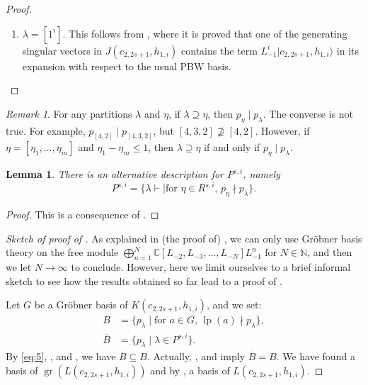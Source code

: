 \documentclass[a4paper, 12pt, reqno]{amsart}
\newtheorem{lemma}[theorem]{Lemma}
\theoremstyle{remark}
\newtheorem{remark}[theorem]{Remark}
\DeclareMathOperator{\gr}{gr}
\DeclareMathOperator{\lp}{lp}
\newcommand{\vac}{{|0\rangle}}
\begin{document}
\begin{proof}
\begin{enumerate}
    From \eqref{eq:6} and , we see that $\lp(u) = \lp((L_{-2}^s\vac)_{(s - sa + d - 1)}|c_{2, 2s + 1}, h_{1, i}\rangle) = L_\lambda|c_{2, 2s + 1}, h_{1, i}\rangle$.
    Finally, by , $u \in J(c_{2, 2s + 1}, h_{1, i})$, and it is clear that $u$ is homogeneous from its definition.
  \item $\lambda = [1^i]$.
    This follows from \cite{benoit_degenerate_1988}, where it is proved that one of the generating singular vectors in $J(c_{2, 2s + 1}, h_{1, i})$ contains the term $L_{-1}^i|c_{2, 2s + 1}, h_{1, i}\rangle$ in its expansion with respect to the usual PBW basis. \qedhere
  \end{enumerate}
\end{proof}

\begin{remark}
  \label{rmk:2}
  For any partitions $\lambda$ and $\eta$, if $\lambda \supseteq \eta$, then $p_\eta \mid p_\lambda$.
  The converse is not true.
  For example, $p_{[4, 2]} \mid p_{[4, 3, 2]}$, but $[4, 3, 2] \nsupseteq [4, 2]$.
  However, if $\eta = [\eta_1, \dots, \eta_m]$ and $\eta_1 - \eta_m \le 1$, then $\lambda \supseteq \eta$ if and only if $p_\eta \mid p_\lambda$.
\end{remark}

\begin{lemma}
  \label{lmm:6}
  There is an alternative description for $P^{s, i}$, namely
  \begin{equation*}
    P^{s, i} = \{\lambda \vdash \mid \text{for $\eta \in R^{s, i}$, $p_\eta \nmid p_\lambda$}\}.
  \end{equation*}
\end{lemma}

\begin{proof}
  This is a consequence of .
\end{proof}

\begin{proof}[Sketch of proof of ]
  As explained in (the proof of) \cite[Theorem 0.4]{salazar_pbw_2024}, we can only use Gröbner basis theory on the free module $\bigoplus_{n = 1}^N\mathbb{C}[L_{-2}, L_{-3}, \dots, L_{-N}]L_{-1}^n$ for $N \in \mathbb{N}$, and then we let $N \to \infty$ to conclude.
  However, here we limit ourselves to a brief informal sketch to see how the results obtained so far lead to a proof of .

  Let $G$ be a Gröbner basis of $K(c_{2, 2s + 1}, h_{1, i})$, and we set:
  \begin{align*}
    B &= \{p_\lambda \mid \text{for $a \in G$, $\lp(a) \nmid p_\lambda$}\}, \\
    \overline{B} &= \{p_\lambda \mid \lambda \in P^{s, i}\}.
  \end{align*}
  By \eqref{eq:5}, , and , we have $\overline{B} \subseteq B$.
  Actually, ,  and  imply $\overline{B} = B$.
  We have found a basis of $\gr(L(c_{2, 2s + 1}, h_{1, i}))$ and by , a basis of $L(c_{2, 2s + 1}, h_{1, i})$.
\end{proof}
\end{document}
